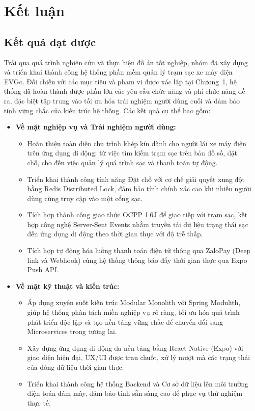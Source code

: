 \section{Kết luận}

\subsection{Kết quả đạt được}
Trải qua quá trình nghiên cứu và thực hiện đồ án tốt nghiệp, nhóm đã xây dựng và triển khai thành công hệ thống phần mềm quản lý trạm sạc xe máy điện EVGo. Đối chiếu với các mục tiêu và phạm vi được xác lập tại Chương~1, hệ thống đã hoàn thành được phần lớn các yêu cầu chức năng và phi chức năng đề ra, đặc biệt tập trung vào tối ưu hóa trải nghiệm người dùng cuối và đảm bảo tính vững chắc của kiến trúc hệ thống. Các kết quả cụ thể bao gồm:

\begin{itemize}
    \item \textbf{Về mặt nghiệp vụ và Trải nghiệm người dùng:}
    \begin{itemize}
        \item Hoàn thiện toàn diện chu trình khép kín dành cho người lái xe máy điện trên ứng dụng di động: từ việc tìm kiếm trạm sạc trên bản đồ số, đặt chỗ, cho đến việc quản lý quá trình sạc và thanh toán tự động.
        \item Triển khai thành công tính năng Đặt chỗ với cơ chế giải quyết xung đột bằng Redis Distributed Lock, đảm bảo tính chính xác cao khi nhiều người dùng cùng truy cập vào một cổng sạc.
        \item Tích hợp thành công giao thức OCPP 1.6J để giao tiếp với trạm sạc, kết hợp công nghệ Server-Sent Events nhằm truyền tải dữ liệu trạng thái sạc đến ứng dụng di động theo thời gian thực với độ trễ thấp.
        \item Tích hợp tự động hóa luồng thanh toán điện tử thông qua ZaloPay (Deep link và Webhook) cùng hệ thống thông báo đẩy thời gian thực qua Expo Push API.
    \end{itemize}
    
    \item \textbf{Về mặt kỹ thuật và kiến trúc:}
    \begin{itemize}
        \item Áp dụng xuyên suốt kiến trúc Modular Monolith với Spring Modulith, giúp hệ thống phân tách miền nghiệp vụ rõ ràng, tối ưu hóa quá trình phát triển độc lập và tạo nền tảng vững chắc để chuyển đổi sang Microservices trong tương lai.
        \item Xây dựng ứng dụng di động đa nền tảng bằng React Native (Expo) với giao diện hiện đại, UX/UI được trau chuốt, xử lý mượt mà các trạng thái của dòng dữ liệu thời gian thực.
        \item Triển khai thành công hệ thống Backend và Cơ sở dữ liệu lên môi trường điện toán đám mây, đảm bảo tính sẵn sàng cao để phục vụ thử nghiệm thực tế.
    \end{itemize}
\end{itemize}

